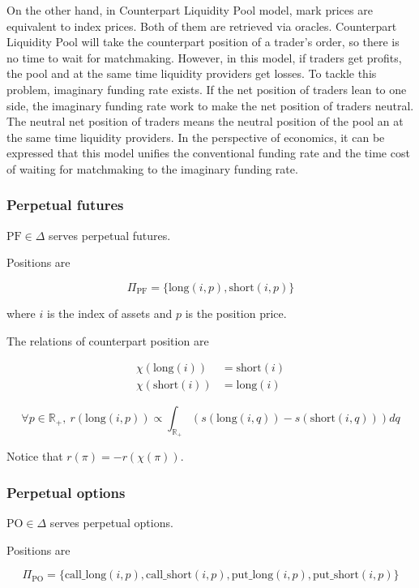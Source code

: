 \documentclass[dvipdfmx]{jsarticle}
\begin{document}
On the other hand, in Counterpart Liquidity Pool model, mark prices are equivalent to index prices. Both of them are retrieved via oracles.
Counterpart Liquidity Pool will take the counterpart position of a trader's order, so there is no time to wait for matchmaking.
However, in this model, if traders get profits, the pool and at the same time liquidity providers get losses.
To tackle this problem, imaginary funding rate exists.
If the net position of traders lean to one side, the imaginary funding rate work to make the net position of traders neutral.
The neutral net position of traders means the neutral position of the pool an at the same time liquidity providers.
In the perspective of economics, it can be expressed that this model unifies the conventional funding rate and the time cost of waiting for matchmaking to the imaginary funding rate.

\subsubsection{Perpetual futures}

$\text{PF} \in \Delta$ serves perpetual futures.

Positions are

$$
  \Pi_{\text{PF}} = \{\text{long}(i, p), \text{short}(i, p)\}
$$

where $i$ is the index of assets and $p$ is the position price.

The relations of counterpart position are

$$
\begin{aligned}
  \chi(\text{long}(i)) & = \text{short}(i) \\
  \chi(\text{short}(i)) & = \text{long}(i)
\end{aligned}
$$

$$
  \forall p \in \mathbb{R}_+, \ r(\text{long}(i, p)) \propto \int_{\mathbb{R}_+} (s(\text{long}(i, q)) - s(\text{short}(i, q))) dq
$$

Notice that $r(\pi) = -r(\chi(\pi))$.

\subsubsection{Perpetual options}

$\text{PO} \in \Delta$ serves perpetual options.

Positions are

$$
  \Pi_{\text{PO}} = \{\text{call\_long}(i, p), \text{call\_short}(i, p), \text{put\_long}(i, p), \text{put\_short}(i, p)\}
$$
\end{document}
